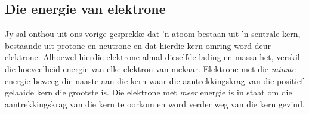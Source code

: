             \subsection*{Die energie van elektrone}
            \nopagebreak
\label{m38741*id259210}
Jy sal onthou uit ons vorige gesprekke dat  'n atoom bestaan ​uit  'n sentrale kern, bestaande uit protone en neutrone en dat hierdie kern omring word deur elektrone. Alhoewel hierdie elektrone almal dieselfde lading en massa het, verskil die hoeveelheid energie van elke elektron van mekaar. Elektrone met die \textsl{minste} energie beweeg die naaste aan die kern waar die aantrekkingskrag van die positief gelaaide kern die grootste is. Die elektrone met \textsl{meer} energie is in staat om die aantrekkingskrag van die kern te oorkom en word verder weg van die kern gevind.\par 


      \label{m38741*uid81}
